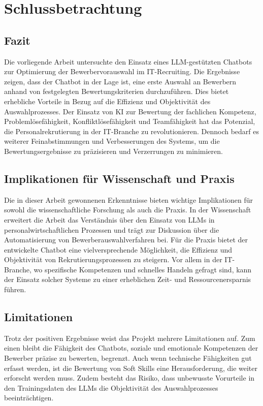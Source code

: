 
\chapter{Schlussbetrachtung}

\section{Fazit}

Die vorliegende Arbeit untersuchte den Einsatz eines \acs{LLM}-gestützten Chatbots zur Optimierung der Bewerbervorauswahl im IT-Recruiting. Die Ergebnisse zeigen, dass der Chatbot in der Lage ist, eine erste Auswahl an Bewerbern anhand von festgelegten Bewertungskriterien durchzuführen. Dies bietet erhebliche Vorteile in Bezug auf die Effizienz und Objektivität des Auswahlprozesses. Der Einsatz von \acs{KI} zur Bewertung der fachlichen Kompetenz, Problemlösefähigkeit, Konfliktlösefähigkeit und Teamfähigkeit hat das Potenzial, die Personalrekrutierung in der IT-Branche zu revolutionieren. Dennoch bedarf es weiterer Feinabstimmungen und Verbesserungen des Systems, um die Bewertungsergebnisse zu präzisieren und Verzerrungen zu minimieren.

\section{Implikationen für Wissenschaft und Praxis}

Die in dieser Arbeit gewonnenen Erkenntnisse bieten wichtige Implikationen für sowohl die wissenschaftliche Forschung als auch die Praxis. In der Wissenschaft erweitert die Arbeit das Verständnis über den Einsatz von \acp{LLM} in personalwirtschaftlichen Prozessen und trägt zur Diskussion über die Automatisierung von Bewerberauswahlverfahren bei. Für die Praxis bietet der entwickelte Chatbot eine vielversprechende Möglichkeit, die Effizienz und Objektivität von Rekrutierungsprozessen zu steigern. Vor allem in der IT-Branche, wo spezifische Kompetenzen und schnelles Handeln gefragt sind, kann der Einsatz solcher Systeme zu einer erheblichen Zeit- und Ressourcenersparnis führen.

\section{Limitationen}

Trotz der positiven Ergebnisse weist das Projekt mehrere Limitationen auf. Zum einen bleibt die Fähigkeit des Chatbots, soziale und emotionale Kompetenzen der Bewerber präzise zu bewerten, begrenzt. Auch wenn technische Fähigkeiten gut erfasst werden, ist die Bewertung von Soft Skills eine Herausforderung, die weiter erforscht werden muss. Zudem besteht das Risiko, dass unbewusste Vorurteile in den Trainingsdaten des \acs{LLM}s die Objektivität des Auswahlprozesses beeinträchtigen.

